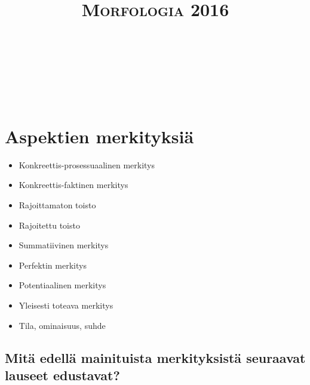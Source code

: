 \documentclass[paper=a4, fontsize=11pt]{scrartcl}
\title{	
\normalfont \normalsize 
\textsc{Morfologia 2016} \\ [25pt] 
\horrule{0.5pt} \\[0.4cm] 
\huge  \\ 
\horrule{2pt} \\[0.5cm] 
}
\date{}
\begin{document}
\section{Aspektien merkityksiä}

\begin{itemize}
    \item Konkreettis-prosessuaalinen merkitys
    \item Konkreettis-faktinen merkitys
    \item Rajoittamaton toisto
    \item Rajoitettu toisto
    \item Summatiivinen merkitys
    \item Perfektin merkitys
    \item Potentiaalinen merkitys
    \item Yleisesti toteava merkitys
    \item Tila, ominaisuus, suhde
\end{itemize}

\onehalfspacing


\subsection{Mitä edellä mainituista merkityksistä seuraavat lauseet edustavat?}
\end{document}
